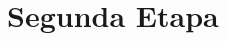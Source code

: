 \documentclass[11pt]{article}
\begin{document}
\newpage

\section*{Segunda Etapa}


\begin{figure}[H]
    
\end{figure}



\end{document}
